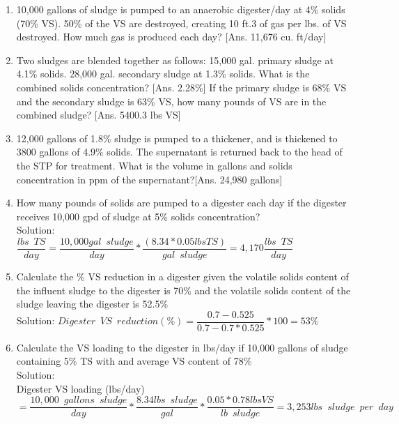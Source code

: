 \begin{enumerate}
\item 10,000 gallons of sludge is pumped to an anaerobic digester/day at 4\% solids (70\% VS).  50\% of the VS are destroyed, creating 10 ft.3 of gas per lbs. of VS destroyed. How much gas is produced each day? [Ans. 11,676 cu. ft/day]

\item Two sludges are blended together as follows: 15,000 gal. primary sludge at 4.1\% solids. 28,000 gal. secondary sludge at 1.3\% solids. 
What is the combined solids concentration? [Ans. 2.28\%]
If the primary sludge is 68\% VS and the secondary sludge is 63\% VS, how many pounds of VS are in the combined sludge? [Ans. 5400.3 lbs VS]


\item 12,000 gallons of 1.8\% sludge is pumped to a thickener, and is thickened to 3800 gallons of 4.9\% solids. The supernatant is returned back to the head of the STP for treatment.  What is the volume in gallons and solids concentration in ppm of the supernatant?[Ans. 24,980 gallons]


\item How many pounds of solids are pumped to a digester each day if the digester receives 10,000 gpd of sludge at 5\% solids concentration?\\


 

Solution:\\

{
$
	\dfrac{lbs \enspace TS}{day}
	=
	\dfrac{10,000 gal \enspace sludge}{day}
	*
	\dfrac{(8.34*0.05 lbs TS )}{gal \enspace sludge}
	=4,170
	\dfrac{lbs \enspace TS}{day}
$
}\\


\item Calculate the \% VS reduction in a digester given the volatile solids content of the influent sludge to the digester is 70\% and the volatile solids content of the sludge leaving the digester is 52.5\%\\
Solution:  $Digester \enspace VS \enspace reduction (\%)=\dfrac{0.7-0.525}{0.7-0.7*0.525}*100=\boxed{ 53\%}$\\

\vspace{0.25cm}
\item Calculate the VS loading to the digester in lbs/day if 10,000 gallons of sludge containing 5\% TS with and average VS content of 78\%\\
Solution:\\
Digester VS loading (lbs/day)\\$=\dfrac{10,000 \enspace gallons \enspace sludge}{day}*\dfrac{8.34lbs \enspace sludge}{gal}*\dfrac{0.05*0.78lbs VS}{lb \enspace sludge}=\boxed{3,253lbs \enspace sludge \enspace per \enspace day}$


\end{enumerate}
